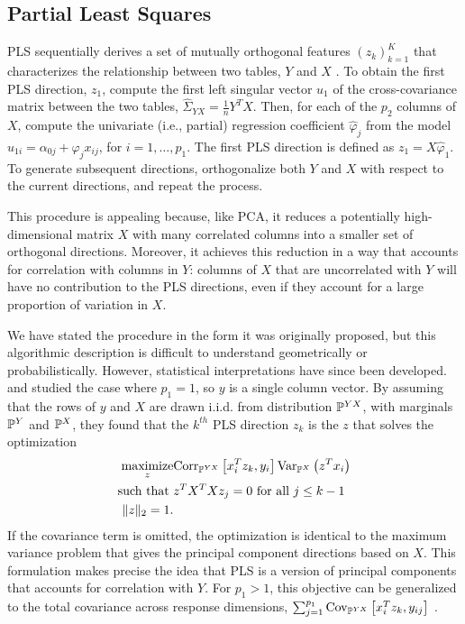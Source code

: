 \documentclass[14pt]{extarticle}
\begin{document}
\subsection{Partial Least Squares}
\label{subsec:PLS}

PLS sequentially derives a set of mutually orthogonal features
$\left(z_{k}\right)_{k = 1}^{K}$ that characterizes the relationship between two
tables, $Y$ and $X$ \citep{wold1985partial}. To obtain the first PLS direction,
$z_{1}$, compute the first left singular vector $u_{1}$ of the cross-covariance
matrix between the two tables, $\hat{\Sigma}_{YX} = \frac{1}{n}Y^{T}X$. Then,
for each of the $p_{2}$ columns of $X$, compute the univariate (i.e., partial)
regression coefficient $\hat{\varphi}_{j}$ from the model $u_{1i} = \alpha_{0j}
+ \varphi_{j}x_{ij}$, for $i = 1, \dots, p_{1}$. The first PLS direction is
defined as $z_{1} = X\hat{\varphi}_{1}$. To generate subsequent directions,
orthogonalize both $Y$ and $X$ with respect to the current directions, and
repeat the process.

This procedure is appealing because, like PCA, it reduces a potentially
high-dimensional matrix $X$ with many correlated columns into a
smaller set of orthogonal directions. Moreover, it achieves this
reduction in a way that accounts for correlation with columns in
$Y$: columns of $X$ that are uncorrelated with $Y$
will have no contribution to the PLS directions, even if they account
for a large proportion of variation in $X$.

We have stated the procedure in the form it was originally proposed, but this
algorithmic description is difficult to understand geometrically or
probabilistically. However, statistical interpretations have since been
developed. \cite{frank1993statistical} and \cite{stone1990continuum} studied the
case where $p_{1} = 1$, so $y$ is a single column vector. By assuming that the
rows of $y$ and $X$ are drawn i.i.d. from distribution $\P^{YX}$, with marginals
$\P^{Y}$ and $\P^{X}$, they found that the $k^{th}$ PLS direction $z_{k}$ is the
$z$ that solves the optimization
\begin{align}
  \label{eq:pls_obj}
\maximize_{z} & \Corrsubarg{\P^{YX}}{x_{i}^{T}z_{k},
y_{i}}\Varsubarg{\P^{X}}{z^{T}x_i} \\
\text{such that }&z^{T}X^{T}X z_{j} = 0 \text{ for all }j \nonumber
\leq k - 1 \nonumber \\
\|z\|_2 = 1. \nonumber
\end{align}
If the covariance term is omitted, the optimization is identical to the maximum
variance problem that gives the principal component directions based on $X$.
This formulation makes precise the idea that PLS is a version of principal
components that accounts for correlation with $Y$. For $p_1 > 1$, this objective
can be generalized to the total covariance across response dimensions, $\sum_{j
  = 1}^{p_1} \Covsubarg{\P^{YX}}{x_i^T z_k, y_{ij}}$
\citep{chun2010sparse}.
\end{document}
